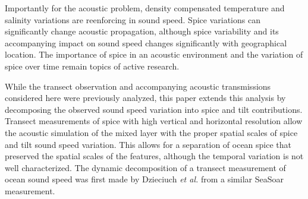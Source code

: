 \documentclass[preprint,NumberedRefs]{JASA}
\begin{document}
Importantly for the acoustic problem, density compensated temperature and salinity variations are reenforcing in sound speed. Spice variations can significantly change acoustic propagation, although spice variability and its accompanying impact on sound speed changes significantly with geographical location\citep{colosi12,colosi13,murat2021}. The importance of spice in an acoustic environment and the variation of spice over time remain topics of active research.




While the transect observation and accompanying acoustic transmissions considered here were previously analyzed\citep{colosi2020observations}, this paper extends this analysis by decomposing the observed sound speed variation into spice and tilt contributions. Transect measurements of spice with high vertical and horizontal resolution allow the acoustic simulation of the mixed layer with the proper spatial scales of spice and tilt sound speed variation. This allows for a separation of ocean spice that preserved the spatial scales of the features, although the temporal variation is not well characterized. The dynamic decomposition of a transect measurement of ocean sound speed was first made by Dzieciuch \emph{et al.}\citep{dzieciuch2004} from a similar SeaSoar measurement.
\end{document}
